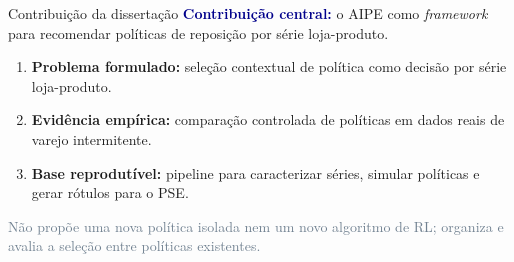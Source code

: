 \begin{frame}{Contribuição da dissertação}
  \small
  \textcolor{darkblue}{\textbf{Contribuição central:}} o AIPE como \textit{framework} para recomendar políticas de reposição por série loja-produto.
  \vspace{0.35em}

  \begin{enumerate}
    \item \textbf{Problema formulado:} seleção contextual de política como
      decisão por série loja-produto.
    \item \textbf{Evidência empírica:} comparação controlada de políticas em
      dados reais de varejo intermitente.
    \item \textbf{Base reprodutível:} pipeline para caracterizar séries,
      simular políticas e gerar rótulos para o PSE.
  \end{enumerate}

  \vspace{0.35em}
  \small\textcolor{slategray}{Não propõe uma nova política isolada nem um novo algoritmo de RL; organiza e avalia a seleção entre políticas existentes.}
\end{frame}
